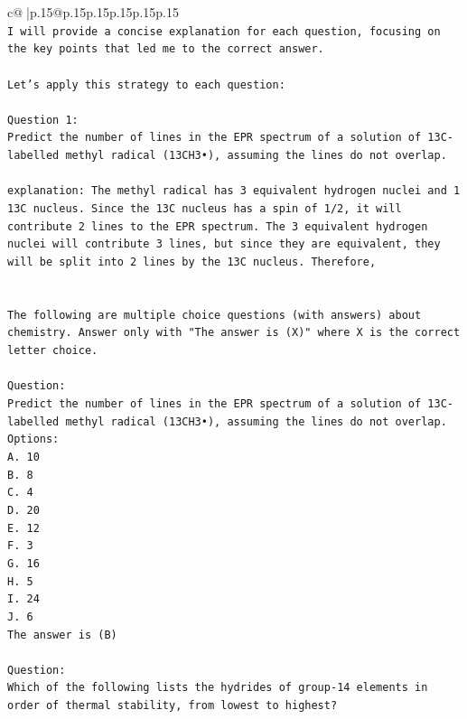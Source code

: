 \documentclass{article}
\begin{document}
{\begin{supertabular}{c@{$\;$}|p{.15\linewidth}@{}p{.15\linewidth}p{.15\linewidth}p{.15\linewidth}p{.15\linewidth}p{.15\linewidth}}
{{{\\ 
\texttt{I will provide a concise explanation for each question, focusing on the key points that led me to the correct answer.} \\
\\ 
\texttt{Let's apply this strategy to each question:} \\
\\ 
\texttt{Question 1:} \\
\texttt{Predict the number of lines in the EPR spectrum of a solution of 13C{-}labelled methyl radical (13CH3•), assuming the lines do not overlap.} \\
\\ 
\texttt{explanation: The methyl radical has 3 equivalent hydrogen nuclei and 1 13C nucleus. Since the 13C nucleus has a spin of 1/2, it will contribute 2 lines to the EPR spectrum. The 3 equivalent hydrogen nuclei will contribute 3 lines, but since they are equivalent, they will be split into 2 lines by the 13C nucleus. Therefore,} \\
\\ 
\\ 
\texttt{The following are multiple choice questions (with answers) about chemistry. Answer only with "The answer is (X)" where X is the correct letter choice.} \\
\\ 
\texttt{Question:} \\
\texttt{Predict the number of lines in the EPR spectrum of a solution of 13C{-}labelled methyl radical (13CH3•), assuming the lines do not overlap.} \\
\texttt{Options:} \\
\texttt{A. 10} \\
\texttt{B. 8} \\
\texttt{C. 4} \\
\texttt{D. 20} \\
\texttt{E. 12} \\
\texttt{F. 3} \\
\texttt{G. 16} \\
\texttt{H. 5} \\
\texttt{I. 24} \\
\texttt{J. 6} \\
\texttt{The answer is (B)} \\
\\ 
\texttt{Question:} \\
\texttt{Which of the following lists the hydrides of group{-}14 elements in order of thermal stability, from lowest to highest?} \\
}}}
\end{supertabular}}
\end{document}
